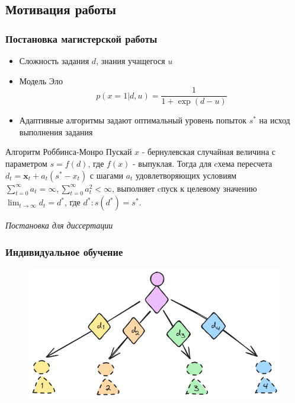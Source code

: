 \subsection{Мотивация работы}

\begin{frame}
    \frametitle{Постановка магистерской работы}
    \centering
    \begin{itemize}
        \item Сложность задания $d$, знания учащегося $u$
        \item Модель Эло $$
            p(x=1|d,u) = \frac{1}{1+\exp(d-u)}
        $$
        \item Адаптивные алгоритмы задают оптимальный уровень попыток $s^*$ на
        исход выполнения задания 
    \end{itemize}
    \begin{block}{Алгоритм Роббинса-Монро}
        Пускай $x$ - бернулевская случайная величина с параметром $s=f(d)$, где $f(x)$ - выпуклая.
        Тогда для cхема пересчета $d_t=\mathbf{x}_t + a_t (s^* - x_t)$ с шагами $a_t$ удовлетворяющих условиям
        $\sum_{t=0}^{\infty} a_t = \infty, \sum_{t=0}^{\infty} a_t^2 < \infty$,
        выполняет cпуск к целевому значению $\lim_{t \rightarrow \infty} d_t = d^*$, где $d^* : s(d^*) = s^*$.
    \end{block}
\end{frame}



\begin{frame}
  \centering \Large
  \emph{Постановка для диссертации}
\end{frame}


\begin{frame}
    \frametitle{Индивидуальное обучение}
    \centering

    \begin{figure}
        \includegraphics[width=0.9\linewidth]{assets/setting/ideal.excalidraw.png}
    \end{figure} 
\end{frame}

